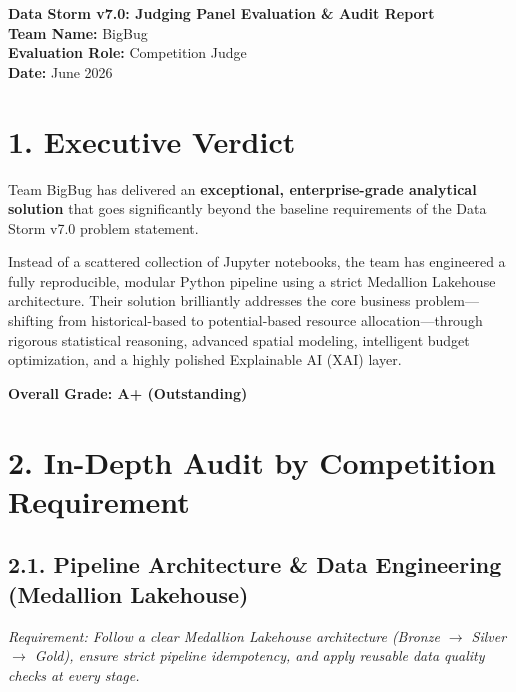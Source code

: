 \documentclass[11pt, a4paper]{article}
\begin{document}
\begin{center}
    {\Huge\bfseries\color{judgeblue} Data Storm v7.0: Judging Panel Evaluation \& Audit Report} \\[0.5cm]
    {\large \textbf{Team Name:} BigBug} \\
    {\large \textbf{Evaluation Role:} Competition Judge} \\
    {\large \textbf{Date:} June 2026}
\end{center}

\vspace{1cm}

\section*{1. Executive Verdict}

Team BigBug has delivered an \textbf{exceptional, enterprise-grade analytical solution} that goes significantly beyond the baseline requirements of the Data Storm v7.0 problem statement. 

Instead of a scattered collection of Jupyter notebooks, the team has engineered a fully reproducible, modular Python pipeline using a strict Medallion Lakehouse architecture. Their solution brilliantly addresses the core business problem---shifting from historical-based to potential-based resource allocation---through rigorous statistical reasoning, advanced spatial modeling, intelligent budget optimization, and a highly polished Explainable AI (XAI) layer.

\textbf{Overall Grade: A+ (Outstanding)}

\vspace{0.5cm}

\section*{2. In-Depth Audit by Competition Requirement}

\subsection*{2.1. Pipeline Architecture \& Data Engineering (Medallion Lakehouse)}
\textit{Requirement: Follow a clear Medallion Lakehouse architecture (Bronze $\rightarrow$ Silver $\rightarrow$ Gold), ensure strict pipeline idempotency, and apply reusable data quality checks at every stage.}
\end{document}
